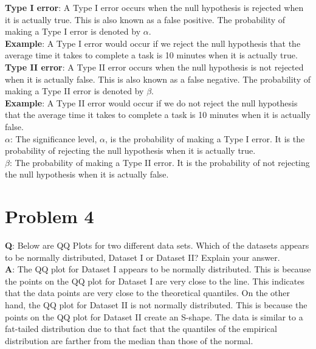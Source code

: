 \documentclass{article}
\begin{document}
\textbf{Type I error}: A Type I error occurs when the null hypothesis is rejected when it is actually true. This is also known as a false positive. The probability of making a Type I error is denoted by $\alpha$.\\
\textbf{Example}: A Type I error would occur if we reject the null hypothesis that the average time it takes to complete a task is 10 minutes when it is actually true.\\

\textbf{Type II error}: A Type II error occurs when the null hypothesis is not rejected when it is actually false. This is also known as a false negative. The probability of making a Type II error is denoted by $\beta$.\\
\textbf{Example}: A Type II error would occur if we do not reject the null hypothesis that the average time it takes to complete a task is 10 minutes when it is actually false.\\

\textbf{$\alpha$}: The significance level, $\alpha$, is the probability of making a Type I error. It is the probability of rejecting the null hypothesis when it is actually true.\\

\textbf{$\beta$}: The probability of making a Type II error. It is the probability of not rejecting the null hypothesis when it is actually false.



\section*{Problem 4}
\textbf{Q}: Below are QQ Plots for two different data sets. Which of the datasets appears to be normally distributed, Dataset I or Dataset II?  Explain your answer.\\

\textbf{A}: The QQ plot for Dataset I appears to be normally distributed. This is because the points on the QQ plot for Dataset I are very close to the line. This indicates that the data points are very close to the theoretical quantiles. On the other hand, the QQ plot for Dataset II is not normally distributed. This is because the points on the QQ plot for Dataset II create an S-shape. The data is similar to a fat-tailed distribution due to that fact that the quantiles of the empirical distribution are farther from the median than those of the normal.
\end{document}

